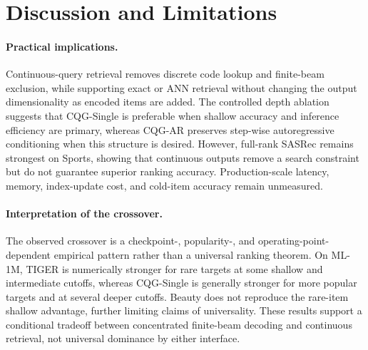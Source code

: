 \documentclass[letterpaper]{article}
\begin{document}
\section{Discussion and Limitations}

\paragraph{Practical implications.}
Continuous-query retrieval removes discrete code lookup and finite-beam
exclusion, while supporting exact or ANN retrieval without changing the
output dimensionality as encoded items are added. The controlled depth
ablation suggests that CQG-Single is preferable when shallow accuracy and
inference efficiency are primary, whereas CQG-AR preserves step-wise
autoregressive conditioning when this structure is desired. However,
full-rank SASRec remains strongest on Sports, showing that continuous
outputs remove a search constraint but do not guarantee superior ranking
accuracy. Production-scale latency, memory, index-update cost, and
cold-item accuracy remain unmeasured.


\paragraph{Interpretation of the crossover.}
The observed crossover is a checkpoint-, popularity-, and
operating-point-dependent empirical pattern
rather than a universal ranking theorem. On ML-1M, TIGER is numerically
stronger for rare targets at some shallow and intermediate cutoffs, whereas
CQG-Single is generally stronger for more popular targets and at several
deeper cutoffs.
Beauty does not reproduce the rare-item shallow advantage,
further limiting claims of universality. These results support a conditional
tradeoff between concentrated finite-beam decoding and continuous retrieval,
not universal dominance by either interface. 

\end{document}
